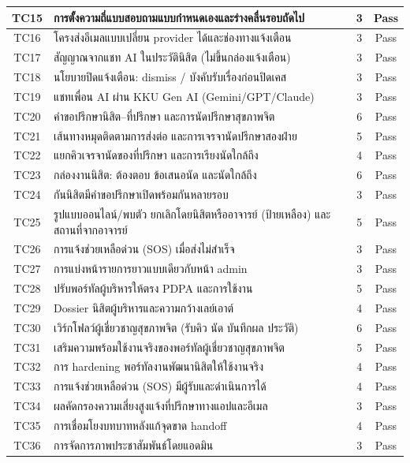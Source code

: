 \documentclass[11pt,a4paper]{article}
\begin{document}
\begin{center}
\begin{tabularx}{0.92\linewidth}{|c|Y|c|c|}
\hline
TC15 & การตั้งความถี่แบบสอบถามแบบกำหนดเองและร่างคลื่นรอบถัดไป & 3 & Pass \\
\hline
TC16 & โครงส่งอีเมลแบบเปลี่ยน provider ได้และช่องทางแจ้งเตือน & 3 & Pass \\
\hline
TC17 & สัญญาณจากแชท AI ในประวัตินิสิต (ไม่ขึ้นกล่องแจ้งเตือน) & 3 & Pass \\
\hline
TC18 & นโยบายปิดแจ้งเตือน: dismiss / บังคับรับเรื่องก่อนปิดเคส & 3 & Pass \\
\hline
TC19 & แชทเพื่อน AI ผ่าน KKU Gen AI (Gemini/GPT/Claude) & 3 & Pass \\
\hline
TC20 & คำขอปรึกษานิสิต--ที่ปรึกษา และการนัดปรึกษาสุขภาพจิต & 6 & Pass \\
\hline
TC21 & เส้นทางหมุดติดตามการส่งต่อ และการเจรจานัดปรึกษาสองฝ่าย & 5 & Pass \\
\hline
TC22 & แยกคิวเจรจานัดของที่ปรึกษา และการเรียงนัดใกล้ถึง & 4 & Pass \\
\hline
TC23 & กล่องงานนิสิต: ต้องตอบ ข้อเสนอนัด และนัดใกล้ถึง & 6 & Pass \\
\hline
TC24 & กันนิสิตมีคำขอปรึกษาเปิดพร้อมกันหลายรอบ & 3 & Pass \\
\hline
TC25 & รูปแบบออนไลน์/พบตัว ยกเลิกโดยนิสิตหรืออาจารย์ (ป้ายเหลือง) และสถานที่จากอาจารย์ & 5 & Pass \\
\hline
TC26 & การแจ้งช่วยเหลือด่วน (SOS) เมื่อส่งไม่สำเร็จ & 3 & Pass \\
\hline
TC27 & การแบ่งหน้ารายการยาวแบบเดียวกับหน้า admin & 3 & Pass \\
\hline
TC28 & ปรับพอร์ทัลผู้บริหารให้ตรง PDPA และการใช้งาน & 5 & Pass \\
\hline
TC29 & Dossier นิสิตผู้บริหารและความกว้างเลย์เอาต์ & 4 & Pass \\
\hline
TC30 & เวิร์กโฟลว์ผู้เชี่ยวชาญสุขภาพจิต (รับคิว นัด บันทึกผล ประวัติ) & 6 & Pass \\
\hline
TC31 & เสริมความพร้อมใช้งานจริงของพอร์ทัลผู้เชี่ยวชาญสุขภาพจิต & 5 & Pass \\
\hline
TC32 & การ hardening พอร์ทัลงานพัฒนานิสิตให้ใช้งานจริง & 4 & Pass \\
\hline
TC33 & การแจ้งช่วยเหลือด่วน (SOS) มีผู้รับและดำเนินการได้ & 4 & Pass \\
\hline
TC34 & ผลคัดกรองความเสี่ยงสูงแจ้งที่ปรึกษาทางแอปและอีเมล & 3 & Pass \\
\hline
TC35 & การเชื่อมโยงบทบาทหลังแก้จุดขาด handoff & 4 & Pass \\
\hline
TC36 & การจัดการภาพประชาสัมพันธ์โดยแอดมิน & 3 & Pass \\

\end{tabularx}
\end{center}
\end{document}
